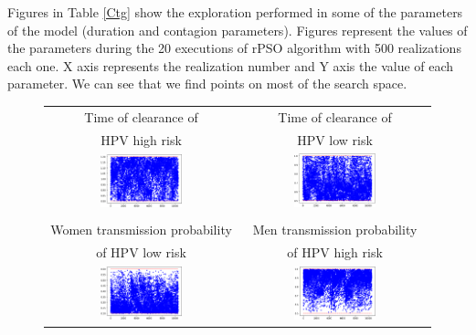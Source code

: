 Figures in Table \ref{Ctg} show the exploration performed in some of the parameters of the model (duration and contagion parameters). Figures represent the values of the parameters during the 20 executions of rPSO algorithm with 500 realizations each one. X axis represents the realization number and Y axis the value of each parameter. We can see that we find points on most of the search space.

\begin{figure}[!h]
\begin{center}	
\begin{tabular}{cc}
	Time of clearance of        & Time of clearance of \\
	HPV high risk               & HPV low risk          \\
	\includegraphics[width=0.45\textwidth]{IMGs/1.-Calibrado/Dura_HR_H.png} & \includegraphics[width=0.45\textwidth]{IMGs/1.-Calibrado/Dura_LR_H.png} \\ 
	\\
	Women transmission probability & Men transmission probability \\
	of HPV low risk                & of HPV high risk             \\
	\includegraphics[width=0.45\textwidth]{IMGs/1.-Calibrado/Ctg_M_LR.png} & \includegraphics[width=0.45\textwidth]{IMGs/1.-Calibrado/Ctg_H_HR.png}  

\end{tabular}
\end{center}
\end{figure}
